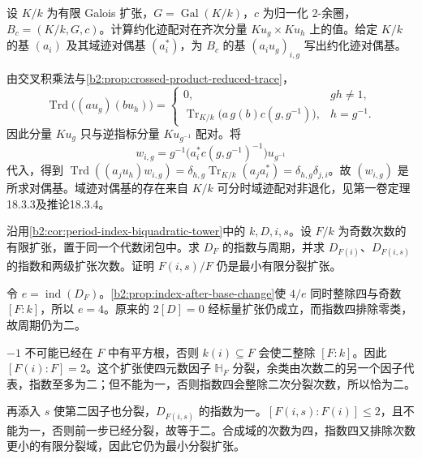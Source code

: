 \begin{exercise}\label{b2:ex:18-crossed-product-reduced-trace}
	设 \(K/k\) 为有限 Galois 扩张，\(G=\operatorname{Gal}(K/k)\)，\(c\) 为归一化 \(2\)-余圈，\(B_c=(K/k,G,c)\)。计算约化迹配对在齐次分量 \(Ku_g\times Ku_h\) 上的值。给定 \(K/k\) 的基 \((a_i)\) 及其域迹对偶基 \((a_i^*)\)，为 \(B_c\) 的基 \((a_i u_g)_{i,g}\) 写出约化迹对偶基。
\end{exercise}
\begin{solution}
	由交叉积乘法与\cref{b2:prop:crossed-product-reduced-trace}，
	\[
		\operatorname{Trd}\bigl((a u_g)(b u_h)\bigr)=
		\begin{cases}
			0,&gh\ne1,\\
			\operatorname{Tr}_{K/k}\bigl(a\,g(b)c(g,g^{-1})\bigr),&h=g^{-1}.
		\end{cases}
	\]
	因此分量 \(Ku_g\) 只与逆指标分量 \(Ku_{g^{-1}}\) 配对。将
	\[
		w_{i,g}=g^{-1}\bigl(a_i^*c(g,g^{-1})^{-1}\bigr)u_{g^{-1}}
	\]
	代入，得到 \(\operatorname{Trd}((a_j u_h)w_{i,g})=\delta_{h,g}\operatorname{Tr}_{K/k}(a_j a_i^*)=\delta_{h,g}\delta_{j,i}\)。故 \((w_{i,g})\) 是所求对偶基。域迹对偶基的存在来自 \(K/k\) 可分时域迹配对非退化，见第一卷定理18.3.3及推论18.3.4。
\end{solution}

\begin{exercise}\label{b2:ex:18-period-index-minimal-splitting}
	沿用\cref{b2:cor:period-index-biquadratic-tower}中的 \(k,D,i,s\)。设 \(F/k\) 为奇数次数的有限扩张，置于同一个代数闭包中。求 \(D_F\) 的指数与周期，并求 \(D_{F(i)}\)、\(D_{F(i,s)}\) 的指数和两级扩张次数。证明 \(F(i,s)/F\) 仍是最小有限分裂扩张。
\end{exercise}
\begin{solution}
	令 \(e=\operatorname{ind}(D_F)\)。\cref{b2:prop:index-after-base-change}使 \(4/e\) 同时整除四与奇数 \([F:k]\)，所以 \(e=4\)。原来的 \(2[D]=0\) 经标量扩张仍成立，而指数四排除零类，故周期仍为二。

	\(-1\) 不可能已经在 \(F\) 中有平方根，否则 \(k(i)\subseteq F\) 会使二整除 \([F:k]\)。因此 \([F(i):F]=2\)。这个扩张使四元数因子 \(\mathbb H_F\) 分裂，余类由次数二的另一个因子代表，指数至多为二；但不能为一，否则指数四会整除二次分裂次数，所以恰为二。

	再添入 \(s\) 使第二因子也分裂，\(D_{F(i,s)}\) 的指数为一。\([F(i,s):F(i)]\le2\)，且不能为一，否则前一步已经分裂，故等于二。合成域的次数为四，指数四又排除次数更小的有限分裂域，因此它仍为最小分裂扩张。
\end{solution}

